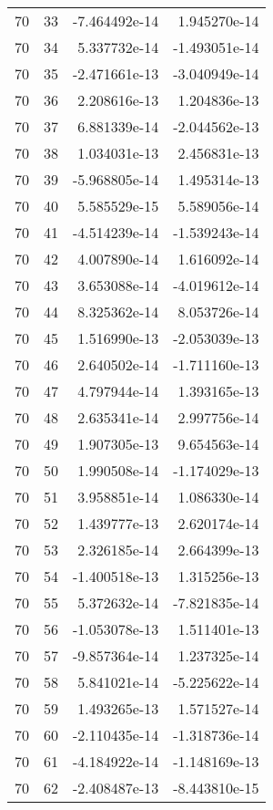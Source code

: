 \begin{tabular}{rrrr}
  70 &   33 & -7.464492e-14 &  1.945270e-14 \\
  70 &   34 &  5.337732e-14 & -1.493051e-14 \\
  70 &   35 & -2.471661e-13 & -3.040949e-14 \\
  70 &   36 &  2.208616e-13 &  1.204836e-13 \\
  70 &   37 &  6.881339e-14 & -2.044562e-13 \\
  70 &   38 &  1.034031e-13 &  2.456831e-13 \\
  70 &   39 & -5.968805e-14 &  1.495314e-13 \\
  70 &   40 &  5.585529e-15 &  5.589056e-14 \\
  70 &   41 & -4.514239e-14 & -1.539243e-14 \\
  70 &   42 &  4.007890e-14 &  1.616092e-14 \\
  70 &   43 &  3.653088e-14 & -4.019612e-14 \\
  70 &   44 &  8.325362e-14 &  8.053726e-14 \\
  70 &   45 &  1.516990e-13 & -2.053039e-13 \\
  70 &   46 &  2.640502e-14 & -1.711160e-13 \\
  70 &   47 &  4.797944e-14 &  1.393165e-13 \\
  70 &   48 &  2.635341e-14 &  2.997756e-14 \\
  70 &   49 &  1.907305e-13 &  9.654563e-14 \\
  70 &   50 &  1.990508e-14 & -1.174029e-13 \\
  70 &   51 &  3.958851e-14 &  1.086330e-14 \\
  70 &   52 &  1.439777e-13 &  2.620174e-14 \\
  70 &   53 &  2.326185e-14 &  2.664399e-13 \\
  70 &   54 & -1.400518e-13 &  1.315256e-13 \\
  70 &   55 &  5.372632e-14 & -7.821835e-14 \\
  70 &   56 & -1.053078e-13 &  1.511401e-13 \\
  70 &   57 & -9.857364e-14 &  1.237325e-14 \\
  70 &   58 &  5.841021e-14 & -5.225622e-14 \\
  70 &   59 &  1.493265e-13 &  1.571527e-14 \\
  70 &   60 & -2.110435e-14 & -1.318736e-14 \\
  70 &   61 & -4.184922e-14 & -1.148169e-13 \\
  70 &   62 & -2.408487e-13 & -8.443810e-15 \\

\end{tabular}
